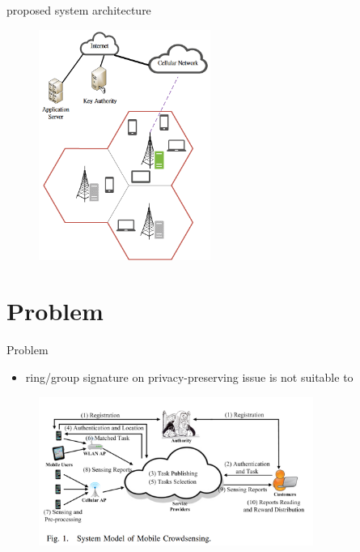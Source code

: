 \documentclass{beamer}
\begin{document}
\begin{frame}{proposed system architecture}
    \begin{figure}[t]
        \centering
        \includegraphics[width=0.5\textwidth]{figures/2.png}
        
    \end{figure}
\end{frame}
\section{Problem}
\begin{frame}{Problem}
    \begin{itemize}
        \item {ring/group signature on privacy-preserving issue is not suitable to \cite{7997116}}
    \end{itemize}
    \begin{figure}[t]
        \centering
        \includegraphics[width=0.8\textwidth]{figures/3.png}
        
    \end{figure}
\end{frame}
\end{document}
